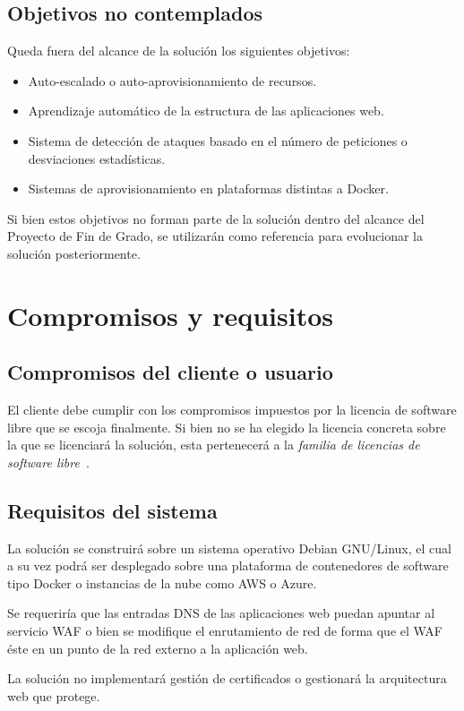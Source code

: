 \subsection{Objetivos no contemplados}
\par Queda fuera del alcance de la solución los siguientes objetivos:
\begin{itemize}
  \item Auto-escalado o auto-aprovisionamiento de recursos.
  \item Aprendizaje automático de la estructura de las aplicaciones web.
  \item Sistema de detección de ataques basado en el número de peticiones o desviaciones estadísticas.
  \item Sistemas de aprovisionamiento en plataformas distintas a Docker.
\end{itemize}
Si bien estos objetivos no forman parte de la solución dentro del alcance del Proyecto de Fin de Grado, se utilizarán como referencia para evolucionar la solución posteriormente.

\section{Compromisos y requisitos}
\subsection{Compromisos del cliente o usuario}
\par El cliente debe cumplir con los compromisos impuestos por la licencia de software libre que se escoja finalmente. Si bien no se ha elegido la licencia concreta sobre la que se licenciará la solución, esta pertenecerá
a la {\em familia de licencias de software libre~\cite{licenciassoftlibre}}.

\subsection{Requisitos del sistema}

\par La solución se construirá sobre un sistema operativo Debian GNU/Linux, el cual a su vez podrá ser desplegado
sobre una plataforma de contenedores de software tipo Docker o instancias de la nube como AWS o Azure.
\par Se requeriría que las entradas DNS de las aplicaciones web puedan apuntar al servicio WAF o bien se modifique el
enrutamiento de red de forma que el WAF éste en un punto de la red externo a la aplicación web.
\par La solución no implementará gestión de certificados o gestionará la arquitectura web que protege.

